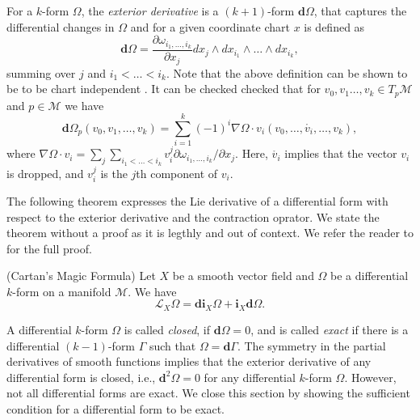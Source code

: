 For a $k$-form $\Omega$, the \emph{exterior derivative} is a $(k+1)$-form $\mathbf d \Omega$, that captures the differential changes in $\Omega$ and for a given coordinate chart $x$ is defined as
\begin{equation} \label{eq:2.13}
	\mathbf d \Omega = \frac{\partial \omega_{i_1,\dots,i_k}}{\partial x_j} dx_j\wedge dx_{i_1}\wedge\dots\wedge dx_{i_k},
\end{equation}
summing over $j$ and $i_1<\dots<i_k$. Note that the above definition can be shown to be to be chart independent \cite{rudin1964principles}. It can be checked checked that for $v_0,v_1\dots,v_k \in T_p\mathcal M$ and $p\in \mathcal M$ we have
\begin{equation} \label{eq:2.14}
	\mathbf d \Omega_p(v_0,v_1,\dots,v_k) = \sum_{i=1}^k (-1)^i \nabla \Omega \cdot v_i (v_0,\dots,\mathring{v_i},\dots,v_k), 
\end{equation}
where $\nabla \Omega \cdot v_i = \sum_j \sum_{i_1<\dots<i_k} v_i^j \partial \omega_{i_1,\dots,i_k}/\partial x_j$. Here, $\mathring{v_i}$ implies that the vector $v_i$ is dropped, and $v_i^j$ is the $j$th component of $v_i$. 

The following theorem expresses the Lie derivative of a differential form with respect to the exterior derivative and the contraction oprator. We state the theorem without a proof as it is legthly and out of context. We refer the reader to \cite{abraham1978foundations} for the full proof.

\begin{theorem} \cite{abraham1978foundations}
(Cartan's Magic Formula) Let $X$ be a smooth vector field and $\Omega$ be a differential $k$-form on a manifold $\mathcal M$. We have
\begin{equation}
	\mathcal L_X \Omega = \mathbf d \mathbf i_X \Omega + \mathbf i_X \mathbf d \Omega.
\end{equation}
\end{theorem}

A differential $k$-form $\Omega$ is called \emph{closed}, if $\mathbf d \Omega = 0$, and is called \emph{exact} if there is a differential $(k-1)$-form $\Gamma$ such that $\Omega = \mathbf d \Gamma$. The symmetry in the partial derivatives of smooth functions implies that the exterior derivative of any differential form is closed, i.e., $\mathbf d^2 \Omega = 0$ for any differential $k$-form $\Omega$. However, not all differential forms are exact. We close this section by showing the sufficient condition for a differential form to be exact.

